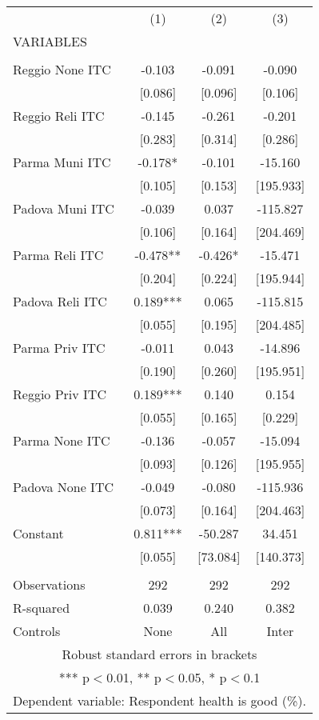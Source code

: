 \begin{tabular}{lccc} \hline
 & (1) & (2) & (3) \\
VARIABLES &  &  &  \\ \hline
 &  &  &  \\
Reggio None ITC & -0.103 & -0.091 & -0.090 \\
 & [0.086] & [0.096] & [0.106] \\
Reggio Reli ITC & -0.145 & -0.261 & -0.201 \\
 & [0.283] & [0.314] & [0.286] \\
Parma Muni ITC & -0.178* & -0.101 & -15.160 \\
 & [0.105] & [0.153] & [195.933] \\
Padova Muni ITC & -0.039 & 0.037 & -115.827 \\
 & [0.106] & [0.164] & [204.469] \\
Parma Reli ITC & -0.478** & -0.426* & -15.471 \\
 & [0.204] & [0.224] & [195.944] \\
Padova Reli ITC & 0.189*** & 0.065 & -115.815 \\
 & [0.055] & [0.195] & [204.485] \\
Parma Priv ITC & -0.011 & 0.043 & -14.896 \\
 & [0.190] & [0.260] & [195.951] \\
Reggio Priv ITC & 0.189*** & 0.140 & 0.154 \\
 & [0.055] & [0.165] & [0.229] \\
Parma None ITC & -0.136 & -0.057 & -15.094 \\
 & [0.093] & [0.126] & [195.955] \\
Padova None ITC & -0.049 & -0.080 & -115.936 \\
 & [0.073] & [0.164] & [204.463] \\
Constant & 0.811*** & -50.287 & 34.451 \\
 & [0.055] & [73.084] & [140.373] \\
 &  &  &  \\
Observations & 292 & 292 & 292 \\
R-squared & 0.039 & 0.240 & 0.382 \\
 Controls & None & All & Inter \\ \hline
\multicolumn{4}{c}{ Robust standard errors in brackets} \\
\multicolumn{4}{c}{ *** p$<$0.01, ** p$<$0.05, * p$<$0.1} \\
\multicolumn{4}{c}{ Dependent variable: Respondent health is good (\%).} \\
\end{tabular}
